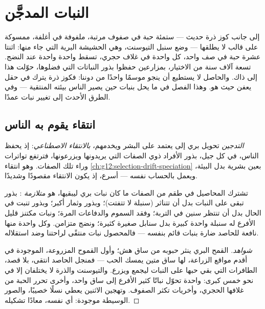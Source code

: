 \chapter{النبات المدجَّن}\label{ch:g12:domesticated-plants}

إلى جانب كوز ذرة حديث --- ستمئة حبة في صفوف مرتبة، ملفوفة في أغلفة،
ممسوكة على قالب لا يطلقها --- وضع سنبل التيوسنت، وهي الحشيشة البرية
التي جاء منها: اثنتا عشرة حبة في صف واحد، كل واحدة في غلاف حجري، تسقط
واحدة واحدة عند النضج. تسعة آلاف سنة من الاختيار، بمزارعين حفظوا بذور
النباتات التي فضلوها، حوّلت هذا إلى ذاك. والحاصل لا يستطيع أن ينجو
موسمًا واحدًا من دوننا: فكوز ذرة يترك في حقل يعفن حيث هو. وهذا الفصل في
ما يحل بنبات حين يصير الناس بيئته المنتقية --- وفي الطرق الأحدث إلى
تغيير  نبات عمدًا.

\section{انتقاء يقوم به الناس}

\begin{definition}\label{def:g12:domesticated-plants:domestication}
\emph{التدجين} تحويل  بري إلى  يعتمد على البشر
ويخدمهم، \emph{بالانتقاء الاصطناعي}: إذ يحفظ
الناس، في كل جيل، بذور الأفراد ذوي الصفات التي يريدونها ويزرعونها،
فترتفع تواترات  وراء تلك الصفات. وهو انتقاء
\cref{ch:g12:selection-drift-speciation} بعين بشرية بدل البيئة، ويعمل
بالحساب نفسه --- أسرع، إذ يكون الانتقاء مقصودًا وشديدًا.
\end{definition}

\begin{proposition}\label{prop:g12:domesticated-plants:traits}
تشترك المحاصيل في طقم من الصفات ما كان نبات بري ليبقيها، هو
\emph{متلازمة }: بذور تبقى على النبات بدل أن تتناثر (سنبلة لا
تتفتت)؛ وبذور وثمار أكبر؛ وبذور تنبت في الحال بدل أن تنتظر سنين في
التربة؛ وفقد السموم والدفاعات المرة؛ ونبات مكتنز قليل الأفرع له سنبلة
واحدة كبيرة بدل سنابل صغيرة كثيرة؛ ونضج متزامن. وكل واحدة منها نافعة
للحاصد ضارة بنبات قائم بنفسه --- فالمحصول نبات منتقًى لراحتنا وضد
استقلاله.
\end{proposition}
\begin{proof}[شواهد]
القمح البري ينثر حبوبه من ساق هش؛ وأول القموح المزروعة، الموجودة في
أقدم مواقع الزراعة، لها ساق متين يمسك الحب --- فمنجل الحاصد انتقى، بلا
قصد، الطافرات التي بقي حبها على النبات ليجمع ويزرع. والتيوسنت والذرة
لا يختلفان إلا في نحو خمس  كبرى: واحدة تحوّل نباتًا كثير الأفرع
إلى ساق واحد، وأخرى تحرر الحبة من غلافها الحجري، وأخريات تكثر الصفوف.
وتهجين الاثنين يعطي نسلًا خصيبًا، والصور الوسيطة موجودة: أي 
نفسه، معادًا تشكيله.
\end{proof}

